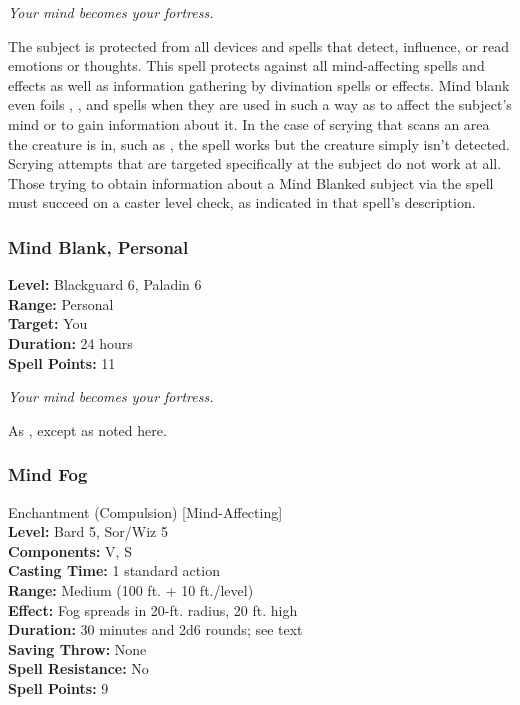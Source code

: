 \emph{Your mind becomes your fortress.}

The subject is protected from all devices and spells that detect, influence, or read emotions or thoughts. 
This spell protects against all mind-affecting spells and effects as well as information gathering by divination spells or effects. 
Mind blank even foils , , and  spells when they are used in such a way as to affect the subject's mind or to gain information about it. 
In the case of scrying that scans an area the creature is in, such as , the spell works but the creature simply isn't detected. 
Scrying attempts that are targeted specifically at the subject do not work at all.
Those trying to obtain information about a Mind Blanked subject via the  spell must succeed on a caster level check, as indicated in that spell's description. 

\subsubsection{Mind Blank, Personal}
\label{Spell:PersonalMindBlank}
\textbf{Level:} Blackguard 6, Paladin 6
\\ \textbf{Range:} Personal
\\ \textbf{Target:} You
\\ \textbf{Duration:} 24 hours
\\ \textbf{Spell Points:} 11

\emph{Your mind becomes your fortress.}

As , except as noted here.
\subsubsection{Mind Fog}
\label{Spell:MindFog}
Enchantment (Compulsion) [Mind-Affecting]
\\ \textbf{Level:} Bard 5, Sor/Wiz 5
\\ \textbf{Components:} V, S
\\ \textbf{Casting Time:} 1 standard action
\\ \textbf{Range:} Medium (100 ft. + 10 ft./level)
\\ \textbf{Effect:} Fog spreads in 20-ft. radius, 20 ft. high
\\ \textbf{Duration:} 30 minutes and 2d6 rounds; see text
\\ \textbf{Saving Throw:} None
\\ \textbf{Spell Resistance:} No
\\ \textbf{Spell Points:} 9


